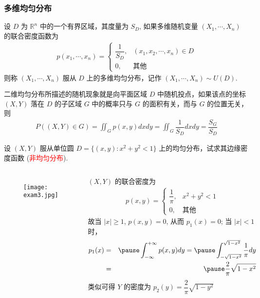 \begin{frame}
	\frametitle{多维均匀分布}
	\begin{defi}
		设 $D$ 为 $\mathbb{R}^ n$ 中的一个有界区域，其度量为 $S_D$, 如果多维随机变量 $(X_1,\cdots, X_n)$ 的联合密度函数为
		\begin{eqnarray*}
			p(x_1,\cdots,x_n)=\left\{
			\begin{array}{ll}
				\dfrac{1}{S_D}, &(x_1,x_2,\cdots,x_n)\in D\\
				0,&\mbox{其他}
			\end{array}\right.
		\end{eqnarray*}
		则称 $(X_1,\cdots,X_n)$ 服从 $D$ 上的多维均匀分布，记作 $(X_1,\cdots, X_n)\sim U (D)$.
	\end{defi}
	\vspace{0.5cm}

	\pause 二维均匀分布所描述的随机现象就是向平面区域 $D$ 中随机投点，如果该点的坐标 $(X,Y)$ 落在 $D$ 的子区域 $G$ 中的概率只与 $G$ 的面积有关，而与 $G$ 的位置无关，\pause 则
	\begin{eqnarray*}
		P((X,Y)\in G)=\iint_{G}p(x,y)dxdy=\iint_{G}\dfrac{1}{S_D}dxdy=\dfrac{S_G}{S_D}
	\end{eqnarray*}

\end{frame}
\begin{frame}
	\vspace{0.4cm}
	\begin{exam}
		设 $(X,Y)$ 服从单位圆 $D=\{(x,y):x^2+y^2<1\}$ 上的均匀分布，试求其边缘密度函数 (\textcolor{red}{非均匀分布}).
	\end{exam}
	\begin{columns}
		\pause   \column{3cm}
		\begin{figure}[h]
			\centering
			\hspace{-1cm} \texttt{[image: exam3.jpg]}
		\end{figure}
		\pause %
		\column{6.5cm}
		\pause $(X,Y)$ 的联合密度为
		\begin{eqnarray*}
			p(x,y)=\left\{
			\begin{array}{ll}
				\dfrac{1}{\pi}, & x^2+y^2<1\\
				0, & \mbox{其他}
			\end{array}\right.
		\end{eqnarray*}
		\pause 故当 $|x|\ge 1$, $p (x,y)=0$, 从而 $p_1 (x)=0$; 当 $|x|<1$ 时，
		\begin{eqnarray*}
			p_1(x)&=&\pause \int_{-\infty}^{+\infty}p(x,y)dy=\pause \int_{-\sqrt{1-x^2}}^{\sqrt{1-x^2}}\dfrac{1}{\pi}dy
			\\
			&=&\pause \dfrac{2}{\pi}\sqrt{1-x^2}
		\end{eqnarray*}\pause
		类似可得 $Y$ 的密度为 $p_2 (y)=\dfrac{2}{\pi}\sqrt{1-y^2}
		$
	\end{columns}
\end{frame}
